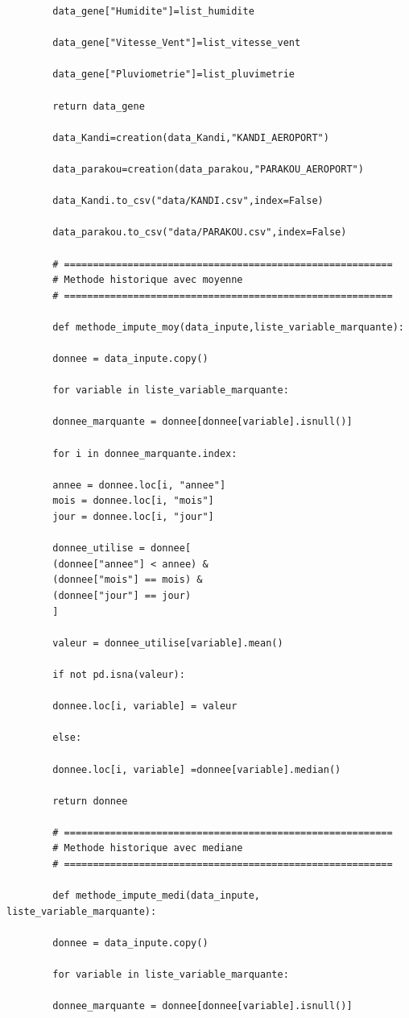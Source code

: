 \documentclass[a4paper,12pt]{report}
\theoremstyle{definition}
\begin{document}
\begin{lstlisting}
		data_gene["Humidite"]=list_humidite
		
		data_gene["Vitesse_Vent"]=list_vitesse_vent
		
		data_gene["Pluviometrie"]=list_pluvimetrie
		
		return data_gene
		
		data_Kandi=creation(data_Kandi,"KANDI_AEROPORT")
		
		data_parakou=creation(data_parakou,"PARAKOU_AEROPORT")
		
		data_Kandi.to_csv("data/KANDI.csv",index=False)
		
		data_parakou.to_csv("data/PARAKOU.csv",index=False)
		
		# =========================================================
		# Methode historique avec moyenne
		# =========================================================
		
		def methode_impute_moy(data_inpute,liste_variable_marquante):
		
		donnee = data_inpute.copy()
		
		for variable in liste_variable_marquante:
		
		donnee_marquante = donnee[donnee[variable].isnull()]
		
		for i in donnee_marquante.index:
		
		annee = donnee.loc[i, "annee"]
		mois = donnee.loc[i, "mois"]
		jour = donnee.loc[i, "jour"]
		
		donnee_utilise = donnee[
		(donnee["annee"] < annee) &
		(donnee["mois"] == mois) &
		(donnee["jour"] == jour)
		]
		
		valeur = donnee_utilise[variable].mean()
		
		if not pd.isna(valeur):
		
		donnee.loc[i, variable] = valeur
		
		else:
		
		donnee.loc[i, variable] =donnee[variable].median()
		
		return donnee
		
		# =========================================================
		# Methode historique avec mediane
		# =========================================================
		
		def methode_impute_medi(data_inpute, liste_variable_marquante):
		
		donnee = data_inpute.copy()
		
		for variable in liste_variable_marquante:
		
		donnee_marquante = donnee[donnee[variable].isnull()]
		

\end{lstlisting}
\end{document}
